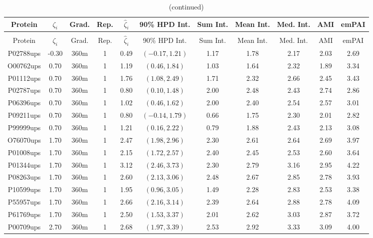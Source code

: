 \begin{landscape}
\begin{longtable}{cccc|cc|ccccc}
\caption{Detailed empirical results for UPS2 experiments, 360m gradient
\label{tab:ups2_360m}} \\
 Protein & $\zeta_i$ & Grad. & Rep. & $\hat{\zeta}_i$ & 90\% HPD Int. & Sum Int. & Mean Int. & Med. Int. & AMI & emPAI \\
\hline
\endfirsthead
\caption{(continued)} \\
 Protein & $\zeta_i$ & Grad. & Rep. & $\hat{\zeta}_i$ & 90\% HPD Int. & Sum Int. & Mean Int. & Med. Int. & AMI & emPAI \\
\hline
\endhead
P02788ups & -0.30 & 360m &   1 & 0.49 & $(-0.17, 1.21)$ & 1.17 & 1.78 & 2.17 & 2.03 & 2.69 \\ 
  O00762ups & 0.70 & 360m &   1 & 1.19 & $(0.46, 1.84)$ & 1.03 & 1.64 & 2.32 & 1.89 & 3.34 \\ 
  P01112ups & 0.70 & 360m &   1 & 1.76 & $(1.08, 2.49)$ & 1.71 & 2.32 & 2.66 & 2.45 & 3.43 \\ 
  P02787ups & 0.70 & 360m &   1 & 0.80 & $(0.10, 1.48)$ & 2.00 & 2.48 & 2.43 & 2.74 & 2.86 \\ 
  P06396ups & 0.70 & 360m &   1 & 1.02 & $(0.46, 1.62)$ & 2.00 & 2.40 & 2.54 & 2.57 & 3.01 \\ 
  P09211ups & 0.70 & 360m &   1 & 0.80 & $(-0.14, 1.79)$ & 0.66 & 1.75 & 2.30 & 2.01 & 2.82 \\ 
  P99999ups & 0.70 & 360m &   1 & 1.21 & $(0.16, 2.22)$ & 0.79 & 1.88 & 2.43 & 2.13 & 3.08 \\ 
  O76070ups & 1.70 & 360m &   1 & 2.47 & $(1.98, 2.96)$ & 2.30 & 2.61 & 2.64 & 2.69 & 3.97 \\ 
  P01008ups & 1.70 & 360m &   1 & 2.15 & $(1.72, 2.57)$ & 2.40 & 2.45 & 2.53 & 2.60 & 3.64 \\ 
  P01344ups & 1.70 & 360m &   1 & 3.12 & $(2.46, 3.73)$ & 2.30 & 2.79 & 3.16 & 2.95 & 4.22 \\ 
  P08263ups & 1.70 & 360m &   1 & 2.60 & $(2.13, 3.06)$ & 2.48 & 2.67 & 2.85 & 2.78 & 3.93 \\ 
  P10599ups & 1.70 & 360m &   1 & 1.95 & $(0.96, 3.05)$ & 1.49 & 2.28 & 2.83 & 2.53 & 3.38 \\ 
  P55957ups & 1.70 & 360m &   1 & 2.66 & $(2.16, 3.14)$ & 2.39 & 2.64 & 2.88 & 2.78 & 4.09 \\ 
  P61769ups & 1.70 & 360m &   1 & 2.50 & $(1.53, 3.37)$ & 2.01 & 2.62 & 3.03 & 2.87 & 3.72 \\ 
  P00709ups & 2.70 & 360m &   1 & 2.68 & $(1.97, 3.39)$ & 2.53 & 2.92 & 3.33 & 3.09 & 4.00 \\ 

\end{longtable}
\end{landscape}
